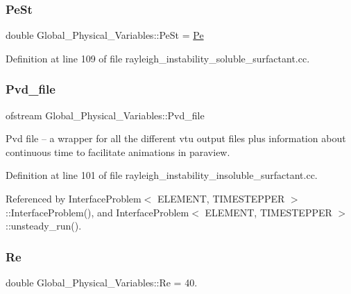 \subsubsection{\texorpdfstring{Pe\+St}{PeSt}}
{\footnotesize\ttfamily double Global\+\_\+\+Physical\+\_\+\+Variables\+::\+Pe\+St = \hyperlink{namespaceGlobal__Physical__Variables_af252119266d6a28d2111d9d52bf59e87}{Pe}}



Definition at line 109 of file rayleigh\+\_\+instability\+\_\+soluble\+\_\+surfactant.\+cc.

\mbox{\label{namespaceGlobal__Physical__Variables_a4f2fe790aa186202e4e2d5f6ee21d7f4}} 
\subsubsection{\texorpdfstring{Pvd\+\_\+file}{Pvd\_file}}
{\footnotesize\ttfamily ofstream Global\+\_\+\+Physical\+\_\+\+Variables\+::\+Pvd\+\_\+file}



Pvd file -- a wrapper for all the different vtu output files plus information about continuous time to facilitate animations in paraview. 



Definition at line 101 of file rayleigh\+\_\+instability\+\_\+insoluble\+\_\+surfactant.\+cc.



Referenced by Interface\+Problem$<$ E\+L\+E\+M\+E\+N\+T, T\+I\+M\+E\+S\+T\+E\+P\+P\+E\+R $>$\+::\+Interface\+Problem(), and Interface\+Problem$<$ E\+L\+E\+M\+E\+N\+T, T\+I\+M\+E\+S\+T\+E\+P\+P\+E\+R $>$\+::unsteady\+\_\+run().

\mbox{\label{namespaceGlobal__Physical__Variables_ab814e627d2eb5bc50318879d19ab16b9}} 
\subsubsection{\texorpdfstring{Re}{Re}}
{\footnotesize\ttfamily double Global\+\_\+\+Physical\+\_\+\+Variables\+::\+Re = 40.}



